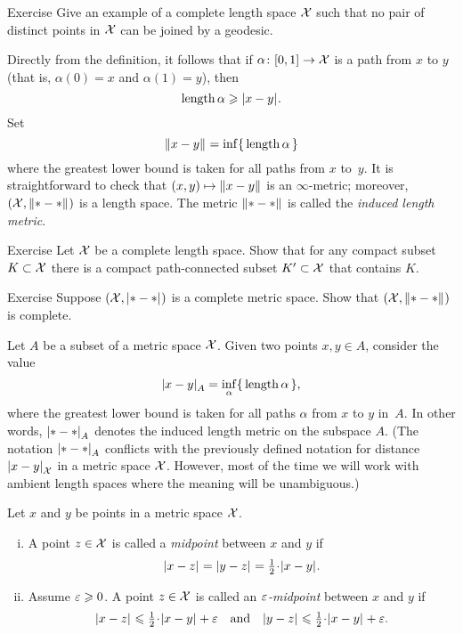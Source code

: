 \begin{thm}{Exercise}\label{ex:no-geod}
Give an example of a complete length space $\mathcal{X}$ such that no pair of distinct points in $\mathcal{X}$ can be joined by a geodesic.
\end{thm}

Directly from the definition, it follows that if $\alpha\colon[0,1]\to\mathcal{X}$ is a path from $x$ to $y$ 
(that is, $\alpha(0)=x$ and $\alpha(1)=y$), then 
\[\length\alpha\ge \dist{x}{y}{}.\]
Set 
\[\yetdist{x}{y}{}=\inf\{\,\length\alpha\,\}\]
where the greatest lower bound is taken for all paths from $x$ to~$y$.
It is straightforward to check that $(x,y)\mapsto \yetdist{x}{y}{}$ is an $\infty$-metric; moreover, $(\spc{X},\yetdist{*}{*}{})$ is a length space.
The metric $\yetdist{*}{*}{}$ is called the \emph{induced length metric}.

\begin{thm}{Exercise}\label{ex:compact+connceted}
Let $\mathcal{X}$ be a complete length space.
Show that for any compact subset $K\subset\mathcal{X}$
there is a compact path-connected subset $K'\subset\mathcal{X}$ that contains $K$.  
\end{thm}

\begin{thm}{Exercise}\label{ex:compact=>complete}
Suppose $(\spc{X},\dist{*}{*}{})$ is a complete metric space.
Show that $(\spc{X},\yetdist{*}{*}{})$ is complete.
\end{thm}

Let $A$ be a subset of a metric space $\mathcal{X}$.
Given two points $x,y\in A$,
consider the value
\[\dist{x}{y}{A}=\inf_{\alpha}\{\,\length\alpha\,\},\]
where the greatest lower bound is taken for all paths $\alpha$ from $x$ to $y$ in~$A$.
In other words, $\dist{*}{*}{A}$ denotes the induced length metric on the subspace $A$.
(The notation $\dist{*}{*}{A}$ conflicts with the previously defined notation for distance $\dist{x}{y}{\spc{X}}$ in a metric space $\mathcal{X}$.
However, most of the time we will work with ambient length spaces where the meaning will be unambiguous.)

Let $x$ and $y$ be points in a metric space $\mathcal{X}$.

\begin{enumerate}[(i)]
\item A point $z\in \mathcal{X}$ is called a \emph{midpoint} between $x$ and $y$
if 
\[\dist{x}{z}{}=\dist{y}{z}{}=\tfrac12\cdot\dist[{{}}]{x}{y}{}.\]
\item Assume $\varepsilon\geqslant 0$.
A point $z\in \mathcal{X}$ is called an \emph{$\varepsilon$-midpoint} between $x$ and $y$
if 
\[\dist{x}{z}{}\le\tfrac12\cdot\dist[{{}}]{x}{y}{}+\eps
\quad\text{and}\quad
\dist{y}{z}{}\le\tfrac12\cdot\dist[{{}}]{x}{y}{}+\eps.\]
\end{enumerate}



